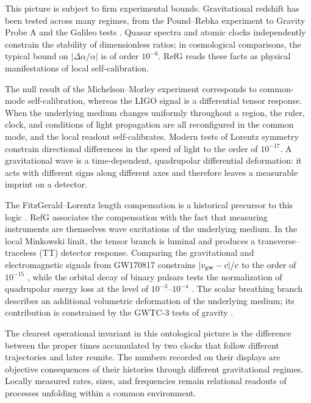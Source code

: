 \documentclass[11pt,a4paper]{article}
\begin{document}
This picture is subject to firm experimental bounds. Gravitational redshift has been tested across many regimes, from the Pound--Rebka experiment to Gravity Probe A and the Galileo tests \citep{pound1960,vessot1980,delva2018,herrmann2018}. Quasar spectra and atomic clocks independently constrain the stability of dimensionless ratios; in cosmological comparisons, the typical bound on $|\Delta\alpha/\alpha|$ is of order $10^{-6}$. RefG reads these facts as physical manifestations of local self-calibration.

The null result of the Michelson--Morley experiment corresponds to common-mode self-calibration, whereas the LIGO signal is a differential tensor response. When the underlying medium changes uniformly throughout a region, the ruler, clock, and conditions of light propagation are all reconfigured in the common mode, and the local readout self-calibrates. Modern tests of Lorentz symmetry constrain directional differences in the speed of light to the order of $10^{-17}$. A gravitational wave is a time-dependent, quadrupolar differential deformation: it acts with different signs along different axes and therefore leaves a measurable imprint on a detector.

The FitzGerald--Lorentz length compensation is a historical precursor to this logic \citep{fitzgerald1889,lorentz1892}. RefG associates the compensation with the fact that measuring instruments are themselves wave excitations of the underlying medium. In the local Minkowski limit, the tensor branch is luminal and produces a transverse--traceless (TT) detector response. Comparing the gravitational and electromagnetic signals from GW170817 constrains $|v_{\rm gw}-c|/c$ to the order of $10^{-15}$ \citep{abbott2017}, while the orbital decay of binary pulsars tests the normalization of quadrupolar energy loss at the level of $10^{-3}$--$10^{-4}$ \citep{weisberg2016,kramer2021}. The scalar breathing branch describes an additional volumetric deformation of the underlying medium; its contribution is constrained by the GWTC-3 tests of gravity \citep{ligovirgokagra2022}.

The clearest operational invariant in this ontological picture is the difference between the proper times accumulated by two clocks that follow different trajectories and later reunite. The numbers recorded on their displays are objective consequences of their histories through different gravitational regimes. Locally measured rates, sizes, and frequencies remain relational readouts of processes unfolding within a common environment.
\end{document}
